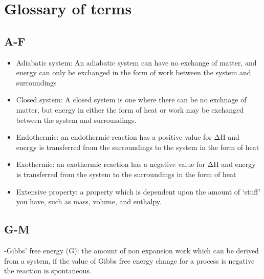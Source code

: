 \documentclass[
]{book}
\begin{document}
\hypertarget{glossary-of-terms}{%
\chapter*{Glossary of terms}\label{glossary-of-terms}}

\hypertarget{a-f}{%
\section*{A-F}\label{a-f}}

\begin{itemize}
\item
  Adiabatic system: An adiabatic system can have no exchange of matter, and energy can only be exchanged in the form of work between the system and surroundings
\item
  Closed system: A closed system is one where there can be no exchnage of matter, but energy in either the form of heat or work may be exchanged between the system and surroundings.
\item
  Endothermic: an endothermic reaction has a positive value for ΔH and energy is transferred from the surroundings to the system in the form of heat
\item
  Exothermic: an exothermic reaction has a negative value for ΔH and energy is transferred from the system to the surroundings in the form of heat
\item
  Extensive property: a property which is dependent upon the amount of `stuff' you have, such as mass, volume, and enthalpy.
\end{itemize}

\hypertarget{g-m}{%
\section*{G-M}\label{g-m}}

-Gibbs' free energy (G): the amount of non expansion work which can be derived from a system, if the value of Gibbs free energy change for a process is negative the reaction is spontaneous.
\end{document}
